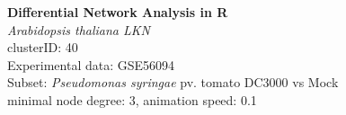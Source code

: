 \documentclass[a0,landscape]{a0poster}
\begin{document}
\clearpage
\thispagestyle{empty}

\begin{center}
{\bf Differential Network Analysis in R}\\%
\emph{Arabidopsis thaliana LKN}\\%
clusterID: 40\\%
Experimental data: GSE56094\\%
Subset:  \emph{Pseudomonas syringae} pv. tomato DC3000 vs Mock\\%
minimal node degree: 3, animation speed: 0.1 \\[96pt]
\end{center}
\end{document}
